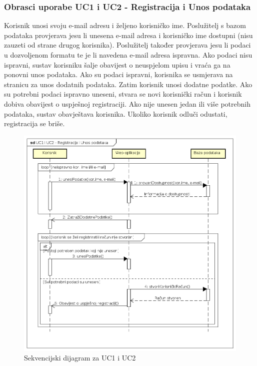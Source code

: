 				\subsubsection{Obrasci uporabe UC1 i UC2 - Registracija i Unos podataka}
				
					Korisnik unosi svoju e-mail adresu i željeno korisničko ime. Poslužitelj s bazom podataka provjerava jesu li unesena e-mail adresa i korisničko ime dostupni (nisu zauzeti od strane drugog korisnika). Poslužitelj također provjerava jesu li podaci u dozvoljenom formatu te je li navedena e-mail adresa ispravna. Ako podaci nisu ispravni, sustav korisniku šalje obavijest o neuspjelom upisu i vraća ga na ponovni unos podataka. Ako su podaci ispravni, korisnika se usmjerava na stranicu za unos dodatnih podataka. \newline
					Zatim korisnik unosi dodatne podatke. Ako su potrebni podaci ispravno uneseni, stvara se novi korisnički račun i korisnik dobiva obavijest o uspješnoj registraciji. Ako nije unesen jedan ili više potrebnih podataka, sustav obavještava korisnika. Ukoliko korisnik odluči odustati, registracija se briše.
				\eject
				
					\begin{figure}[h]
						\includegraphics[scale=0.63]{dijagrami/UML_sd_UC1UC2.PNG}
						\centering
						\caption{Sekvencijski dijagram za UC1 i UC2}
						\label{fig:UML_sd_UC1UC2}
					\end{figure}
				
